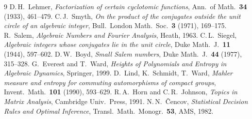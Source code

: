 \documentclass[11pt]{article}
\theoremstyle{plain}
\theoremstyle{definition}
\theoremstyle{remark}
\begin{document}
\begin{thebibliography}{9}\small
{} D.\,H.~Lehmer, \emph{Factorization of certain cyclotomic
functions}, Ann.\ of Math.\ \textbf{34} (1933), 461--479.
 C.\,J.~Smyth, \emph{On the product of the conjugates outside the
unit circle of an algebraic integer}, Bull.\ London Math.\ Soc.\ \textbf{3} (1971),
169--175.
 R.~Salem, \emph{Algebraic Numbers and Fourier Analysis}, Heath,
1963.
 C.\,L.~Siegel, \emph{Algebraic integers whose conjugates lie in
the unit circle}, Duke Math.\ J.\ \textbf{11} (1944), 597--602.
 D.\,W.~Boyd, \emph{Small Salem numbers}, Duke Math.\ J.\
\textbf{44} (1977), 315--328.
 G.~Everest and T.~Ward, \emph{Heights of Polynomials and
Entropy in Algebraic Dynamics}, Springer, 1999.
 D.~Lind, K.~Schmidt, T.~Ward, \emph{Mahler measure and
entropy for commuting automorphisms of compact groups}, Invent.\ Math.\ \textbf{101}
(1990), 593--629.
 R.\,A.~Horn and C.\,R.~Johnson, \emph{Topics in Matrix
Analysis}, Cambridge Univ.\ Press, 1991.
 N.\,N.~\v{C}encov, \emph{Statistical Decision Rules and Optimal
Inference}, Transl.\ Math.\ Monogr.\ \textbf{53}, AMS, 1982.
\end{thebibliography}
\end{document}
